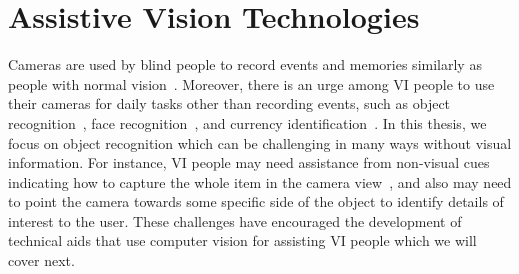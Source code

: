 




\section{Assistive Vision Technologies}\label{chap1:sec:assistive_vision} 

Cameras are used by blind people to record events and memories similarly as people with normal vision~\cite{jayant2011supporting}. Moreover, there is an urge among VI people to use their cameras for daily tasks other than recording events, such as object recognition~\cite{brady2013visual}, face recognition~\cite{zhao2018face}, and currency identification~\cite{liu2008camera}. 
In this thesis, we focus on object recognition which can be challenging in many ways without visual information. For instance, VI people may need assistance from non-visual cues indicating how to capture the whole item in the camera view~\cite{vazquez2012helping}, and also may need to point the camera towards some specific side of the object to identify details of interest to the user. These challenges have encouraged the development of technical aids that use computer vision for assisting VI people which we will cover next. 



